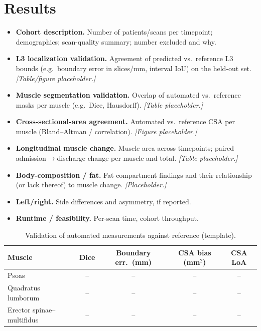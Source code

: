 \documentclass{article}
\begin{document}
\section{Results}
\begin{itemize}
  \item \textbf{Cohort description.} Number of patients/scans per timepoint;
        demographics; scan-quality summary; number excluded and why.
  \item \textbf{L3 localization validation.} Agreement of predicted vs.\
        reference L3 bounds (e.g.\ boundary error in slices/mm, interval IoU) on
        the held-out set. \emph{[Table/figure placeholder.]}
  \item \textbf{Muscle segmentation validation.} Overlap of automated vs.\
        reference masks per muscle (e.g.\ Dice, Hausdorff). \emph{[Table
        placeholder.]}
  \item \textbf{Cross-sectional-area agreement.} Automated vs.\ reference CSA
        per muscle (Bland--Altman / correlation). \emph{[Figure placeholder.]}
  \item \textbf{Longitudinal muscle change.} Muscle area across timepoints;
        paired admission$\rightarrow$discharge change per muscle and total.
        \emph{[Table placeholder.]}
  \item \textbf{Body-composition / fat.} Fat-compartment findings and their
        relationship (or lack thereof) to muscle change. \emph{[Placeholder.]}
  \item \textbf{Left/right.} Side differences and asymmetry, if reported.
  \item \textbf{Runtime / feasibility.} Per-scan time, cohort throughput.
\end{itemize}

\begin{table}[h]
\centering
\caption{Validation of automated measurements against reference (template).}
\label{tab:validation}
\begin{tabular}{lcccc}
\toprule
Muscle & Dice & Boundary err.\ (mm) & CSA bias (mm$^2$) & CSA LoA \\
\midrule
Psoas               & -- & -- & -- & -- \\
Quadratus lumborum  & -- & -- & -- & -- \\
Erector spinae--multifidus & -- & -- & -- & -- \\
\bottomrule
\end{tabular}
\end{table}
\end{document}
